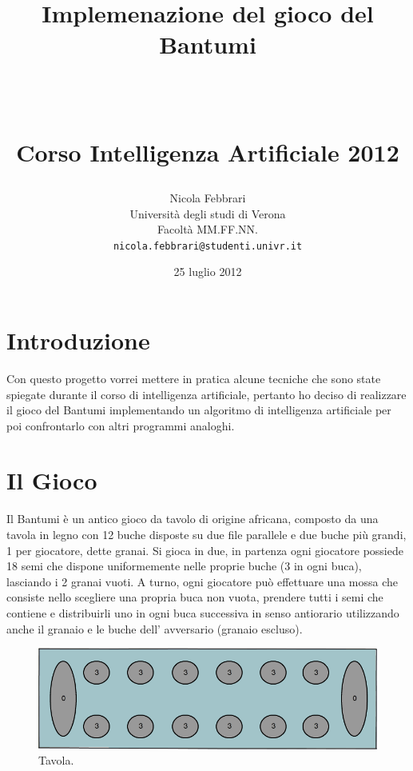 \documentclass[paper=a4, fontsize=11pt]{scrartcl}	%
\title{ \vspace{-1in} 	\usefont{OT1}{bch}{b}{n}
		\huge \strut Implemenazione del gioco del Bantumi \strut \\
		\Large \bfseries \strut Corso Intelligenza Artificiale 2012 \strut
}
\author{ 									\usefont{OT1}{bch}{m}{n}
        Nicola Febbrari\\		\usefont{OT1}{bch}{m}{n}
        Universit\`a degli studi di Verona\\	\usefont{OT1}{bch}{m}{n}
        Facolt\`a MM.FF.NN.\\
        \texttt{nicola.febbrari@studenti.univr.it}
}
\date{25 luglio 2012}
\numberwithin{equation}{section}															%
\numberwithin{figure}{section}																%
\numberwithin{table}{section}																%
\begin{document}
\maketitle
\section{Introduzione}
Con questo progetto vorrei mettere in pratica alcune  tecniche che sono state spiegate durante il corso di intelligenza artificiale, pertanto ho deciso di realizzare il gioco del Bantumi implementando un algoritmo di intelligenza artificiale per poi confrontarlo con altri programmi analoghi.

\section{Il Gioco}
Il Bantumi \`e un antico gioco da tavolo di origine africana, composto da una tavola in legno con 12 buche disposte su due file parallele e due buche pi\`u grandi, 1 per giocatore, dette granai.
Si gioca in due, in partenza ogni giocatore possiede 18 semi che dispone uniformemente nelle proprie buche (3 in ogni buca), lasciando i 2 granai vuoti.
A turno, ogni giocatore pu\`o effettuare una mossa che consiste nello scegliere una propria buca non vuota, prendere tutti i semi che contiene e distribuirli uno in ogni buca successiva in senso antiorario utilizzando anche il granaio e le buche dell' avversario (granaio escluso).



\begin{figure}[h]
\centering
        \includegraphics[totalheight=4.4cm]{Bantumi.png}
    \caption{Tavola.}
    \label{fig:verticalcell}
\end{figure}
\end{document}
